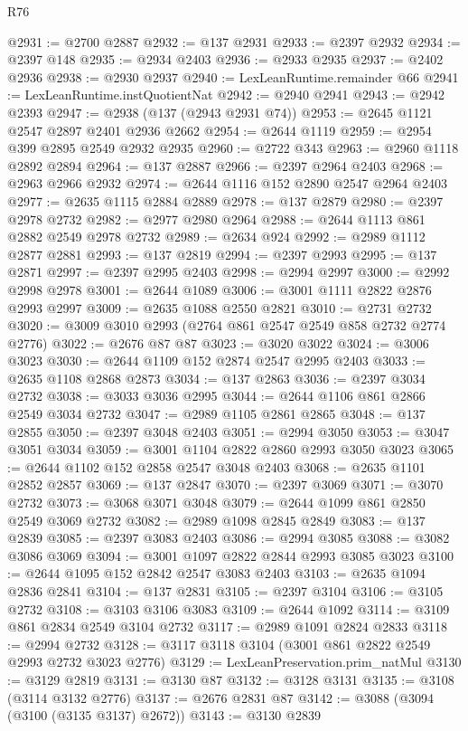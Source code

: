 \begin{lexlean}{R76}
\begin{coremodule}
@2931 := @2700 @2887
@2932 := @137 @2931
@2933 := @2397 @2932
@2934 := @2397 @148
@2935 := @2934 @2403
@2936 := @2933 @2935
@2937 := @2402 @2936
@2938 := @2930 @2937
@2940 := LexLeanRuntime.remainder @66
@2941 := LexLeanRuntime.instQuotientNat
@2942 := @2940 @2941
@2943 := @2942 @2393
@2947 := @2938 (@137 (@2943 @2931 @74))
@2953 := @2645 @1121 @2547 @2897 @2401 @2936 @2662
@2954 := @2644 @1119
@2959 := @2954 @399 @2895 @2549 @2932 @2935
@2960 := @2722 @343
@2963 := @2960 @1118 @2892 @2894
@2964 := @137 @2887
@2966 := @2397 @2964 @2403
@2968 := @2963 @2966 @2932
@2974 := @2644 @1116 @152 @2890 @2547 @2964 @2403
@2977 := @2635 @1115 @2884 @2889
@2978 := @137 @2879
@2980 := @2397 @2978 @2732
@2982 := @2977 @2980 @2964
@2988 := @2644 @1113 @861 @2882 @2549 @2978 @2732
@2989 := @2634 @924
@2992 := @2989 @1112 @2877 @2881
@2993 := @137 @2819
@2994 := @2397 @2993
@2995 := @137 @2871
@2997 := @2397 @2995 @2403
@2998 := @2994 @2997
@3000 := @2992 @2998 @2978
@3001 := @2644 @1089
@3006 := @3001 @1111 @2822 @2876 @2993 @2997
@3009 := @2635 @1088 @2550 @2821
@3010 := @2731 @2732
@3020 := @3009 @3010 @2993 (@2764 @861 @2547 @2549 @858 @2732 @2774 @2776)
@3022 := @2676 @87 @87
@3023 := @3020 @3022
@3024 := @3006 @3023
@3030 := @2644 @1109 @152 @2874 @2547 @2995 @2403
@3033 := @2635 @1108 @2868 @2873
@3034 := @137 @2863
@3036 := @2397 @3034 @2732
@3038 := @3033 @3036 @2995
@3044 := @2644 @1106 @861 @2866 @2549 @3034 @2732
@3047 := @2989 @1105 @2861 @2865
@3048 := @137 @2855
@3050 := @2397 @3048 @2403
@3051 := @2994 @3050
@3053 := @3047 @3051 @3034
@3059 := @3001 @1104 @2822 @2860 @2993 @3050 @3023
@3065 := @2644 @1102 @152 @2858 @2547 @3048 @2403
@3068 := @2635 @1101 @2852 @2857
@3069 := @137 @2847
@3070 := @2397 @3069
@3071 := @3070 @2732
@3073 := @3068 @3071 @3048
@3079 := @2644 @1099 @861 @2850 @2549 @3069 @2732
@3082 := @2989 @1098 @2845 @2849
@3083 := @137 @2839
@3085 := @2397 @3083 @2403
@3086 := @2994 @3085
@3088 := @3082 @3086 @3069
@3094 := @3001 @1097 @2822 @2844 @2993 @3085 @3023
@3100 := @2644 @1095 @152 @2842 @2547 @3083 @2403
@3103 := @2635 @1094 @2836 @2841
@3104 := @137 @2831
@3105 := @2397 @3104
@3106 := @3105 @2732
@3108 := @3103 @3106 @3083
@3109 := @2644 @1092
@3114 := @3109 @861 @2834 @2549 @3104 @2732
@3117 := @2989 @1091 @2824 @2833
@3118 := @2994 @2732
@3128 := @3117 @3118 @3104 (@3001 @861 @2822 @2549 @2993 @2732 @3023 @2776)
@3129 := LexLeanPreservation.prim_natMul
@3130 := @3129 @2819
@3131 := @3130 @87
@3132 := @3128 @3131
@3135 := @3108 (@3114 @3132 @2776)
@3137 := @2676 @2831 @87
@3142 := @3088 (@3094 (@3100 (@3135 @3137) @2672))
@3143 := @3130 @2839

\end{coremodule}
\end{lexlean}
